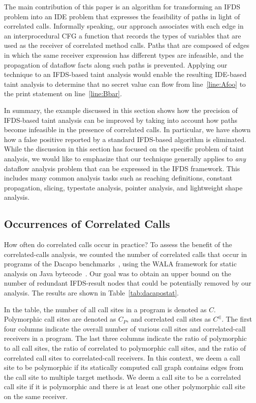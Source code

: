The main contribution of this paper is an algorithm for transforming an IFDS problem 
into an IDE problem that expresses the feasibility of paths
in light of correlated calls.
Informally speaking, our approach associates with each edge in an
interprocedural CFG a function that records the types of 
variables that are used as the receiver of correlated method calls. Paths that 
are composed of edges in which the same receiver expression has different types
are infeasible, and the propagation of dataflow facts along such paths is
prevented. Applying our technique to an IFDS-based taint analysis would enable
the resulting IDE-based taint analysis to determine that no secret value can flow from
line~\ref{line:Afoo} to the print statement on line~\ref{line:Bbar}. 

In summary, the example discussed in this section shows how the precision of 
IFDS-based taint analysis can be improved by taking into account how paths
become infeasible in the presence of correlated calls. In particular, we have
shown how a false positive reported by a standard IFDS-based algorithm is eliminated.
While the discussion in this section has focused on the specific problem of taint analysis,
we would like to emphasize that our technique generally applies to \textit{any}
dataflow analysis problem that can be expressed in the IFDS framework. This includes
many common analysis tasks such as reaching definitions, constant propagation, slicing,
typestate analysis, pointer analysis, and lightweight
shape analysis.

\subsection{Occurrences of Correlated Calls}
How often do correlated calls occur in practice? To assess the benefit of the correlated-calls analysis, we counted the number of correlated calls that occur in programs of the Dacapo benchmarks~\cite{blackburn2006dacapo}, using the WALA framework for static analysis on Java bytecode~\cite{fink2012wala}.
Our goal was to obtain an upper bound on the number of redundant IFDS-result nodes that could be potentially removed by our analysis. The results are shown in Table~\ref{tab:dacapostat}.

In the table, the number of all call sites in a program is denoted as $C$. 
Polymorphic call sites are denoted as $C_P$, and correlated call sites as $C^\Subset$. 
The first four columns indicate the overall number of various call sites and correlated-call receivers in a program. 
The last three columns indicate the ratio of polymorphic to all call sites, the ratio of correlated to polymorphic call sites, and the ratio of correlated call sites to correlated-call receivers.
In this context, we deem a call site to be polymorphic if its statically computed call graph
contains edges from the call site to multiple target methods.
We deem a call site to be a correlated call site if it is polymorphic and there is
at least one other polymorphic call site on the same receiver.

